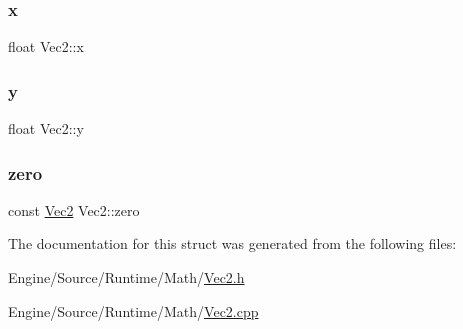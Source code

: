 \mbox{\label{struct_vec2_adf8ee322d4b4bcc04146762c018d731f}} 
\subsubsection{\texorpdfstring{x}{x}}
{\footnotesize\ttfamily float Vec2\+::x}

\mbox{\label{struct_vec2_a30543787e62f6d915543cf1dfb04c094}} 
\subsubsection{\texorpdfstring{y}{y}}
{\footnotesize\ttfamily float Vec2\+::y}

\mbox{\label{struct_vec2_a79378f8c63a15abc98bf639c839f345e}} 
\subsubsection{\texorpdfstring{zero}{zero}}
{\footnotesize\ttfamily const \mbox{\hyperlink{struct_vec2}{Vec2}} Vec2\+::zero\hspace{0.3cm}{\ttfamily [static]}}



The documentation for this struct was generated from the following files\+:\begin{DoxyCompactItemize}
\item 
Engine/\+Source/\+Runtime/\+Math/\mbox{\hyperlink{_vec2_8h}{Vec2.\+h}}\item 
Engine/\+Source/\+Runtime/\+Math/\mbox{\hyperlink{_vec2_8cpp}{Vec2.\+cpp}}\end{DoxyCompactItemize}
